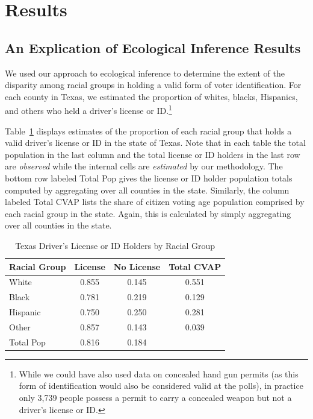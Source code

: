\documentclass[12pt]{article}
\begin{document}
\section{Results}\label{s:res}

\subsection{An Explication of Ecological Inference Results}

We used our approach to ecological inference to determine the extent
of the disparity among racial groups in holding a valid form of voter
identification. For each county in Texas, we estimated the proportion
of whites, blacks, Hispanics, and others who held a driver's
license or ID.\footnote{While we could have also used data on concealed hand
  gun permits (as this form of identification would also be considered
  valid at the polls), in practice only 3,739 people possess a permit to
  carry a concealed weapon but not a driver's license or ID.}

Table~\ref{cvap_f3_ex} displays estimates of the proportion of each
racial group that holds a valid driver's license or ID in the state of
Texas. Note that in each table the total population in the last column
and the total license or ID holders in the last row are {\it observed} while
the internal cells are {\it estimated} by our methodology. The bottom
row labeled Total Pop gives the license or ID holder population totals
computed by aggregating over all counties in the state.  Similarly,
the column labeled Total CVAP lists the share of citizen voting age
population comprised by each racial group in the state.  Again, this
is calculated by simply aggregating over all counties in the state.

\begin{table}[ht]
\begin{center}
\caption{\label{cvap_f3_ex}Texas Driver's License or ID Holders by Racial Group}
\begin{tabular}{lccc}
  \hline
Racial Group & License & No License & Total CVAP\\
  \hline
White & 0.855 & 0.145 & 0.551 \\ 
Black & 0.781 & 0.219 & 0.129 \\ 
Hispanic & 0.750 & 0.250 & 0.281 \\ 
Other & 0.857 & 0.143 & 0.039 \\ 
Total Pop & 0.816 & 0.184 &   \\ 
   \hline

\end{tabular}
\end{center}
\end{table}
\end{document}
